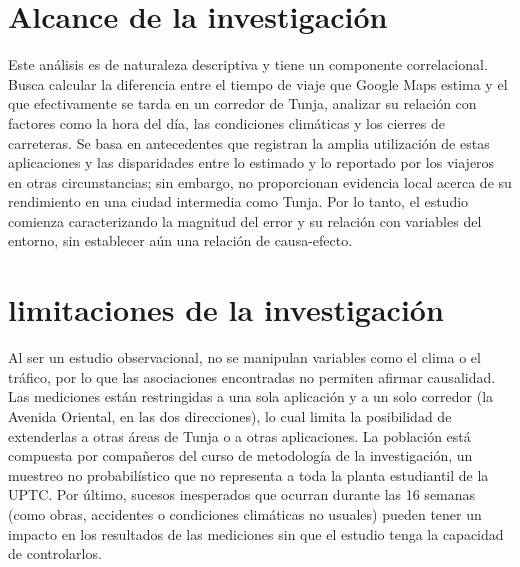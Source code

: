 \section{Alcance de la investigación}
Este análisis es de naturaleza descriptiva y tiene un componente correlacional. Busca calcular la diferencia entre el tiempo de viaje que Google Maps estima y el que efectivamente se tarda en un corredor de Tunja, analizar su relación con factores como la hora del día, las condiciones climáticas  y los cierres de carreteras. Se basa en antecedentes que registran la amplia utilización de estas aplicaciones y las disparidades entre lo estimado y lo reportado por los viajeros en otras circunstancias; sin embargo, no proporcionan evidencia local acerca de su rendimiento en una ciudad intermedia como Tunja. Por lo tanto, el estudio comienza caracterizando la magnitud del error y su relación con variables del entorno, sin establecer aún una relación de causa-efecto.
\section*{limitaciones de la investigación}

Al ser un estudio observacional, no se manipulan variables como el clima o el tráfico, por lo que las asociaciones encontradas no permiten afirmar causalidad. Las mediciones están restringidas a una sola aplicación y a un solo corredor (la Avenida Oriental, en las dos direcciones), lo cual limita la posibilidad de extenderlas a otras áreas de Tunja o a otras aplicaciones. La población está compuesta por compañeros del curso de metodología de la investigación, un muestreo no probabilístico que no representa a toda la planta estudiantil de la UPTC. Por último, sucesos inesperados que ocurran durante las 16 semanas (como obras, accidentes o condiciones climáticas no usuales) pueden tener un impacto en los resultados de las mediciones sin que el estudio tenga la capacidad de controlarlos.